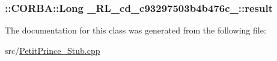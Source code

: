 \subsubsection[{\texorpdfstring{result}{result}}]{\setlength{\rightskip}{0pt plus 5cm}\+::C\+O\+R\+B\+A\+::\+Long \+\_\+R\+L\+\_\+cd\+\_\+c93297503b4b476c\+\_\+::result}\hypertarget{class__0_r_l__cd__c93297503b4b476c__31000000_a6e7a1986f3ea1dda54668466a335a2e2}{}\label{class__0_r_l__cd__c93297503b4b476c__31000000_a6e7a1986f3ea1dda54668466a335a2e2}


The documentation for this class was generated from the following file\+:\begin{DoxyCompactItemize}
\item 
src/\hyperlink{_petit_prince___stub_8cpp}{Petit\+Prince\+\_\+\+Stub.\+cpp}\end{DoxyCompactItemize}
